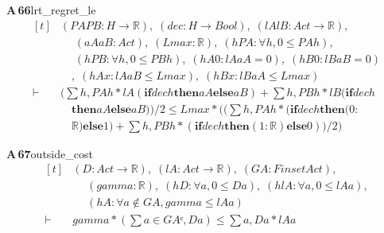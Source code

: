 \documentclass[conference]{IEEEtran}
\theoremstyle{definition}
\newcommand{\lean}[1]{\textsf{\footnotesize #1}}
\begin{document}
\noindent\textbf{A\,66}\quad\lean{lrt\_regret\_le}
{\footnotesize\[ \begin{aligned}[t]
&(\mathit{PA} \mathit{PB} : \mathit{H} \to \mathbb{R} ),\; (\mathit{dec} : \mathit{H} \to \mathit{Bool}),\; (\mathit{lA} \mathit{lB} : \mathit{Act} \to \mathbb{R} ),\\
&\quad \; (\mathit{aA} \mathit{aB} : \mathit{Act}),\; (\mathit{Lmax} : \mathbb{R} ),\; (\mathit{hPA} : \forall \mathit{h}, 0 \leq \mathit{PA} \mathit{h}),\\
&\quad \; (\mathit{hPB} : \forall \mathit{h}, 0 \leq \mathit{PB} \mathit{h}),\; (\mathit{hA0} : \mathit{lA} \mathit{aA} = 0),\; (\mathit{hB0} : \mathit{lB} \mathit{aB} = 0)\\
&\quad ,\; (\mathit{hAx} : \mathit{lA} \mathit{aB} \leq \mathit{Lmax}),\; (\mathit{hBx} : \mathit{lB} \mathit{aA} \leq \mathit{Lmax})\\
\vdash\;&(\textstyle\sum \mathit{h}, \mathit{PA} \mathit{h} * \mathit{lA} (\mathbf{if} \mathit{dec} \mathit{h} \mathbf{then} \mathit{aA} \mathbf{else} \mathit{aB}) + \textstyle\sum \mathit{h}, \mathit{PB} \mathit{h} * \mathit{lB} (\mathbf{if} \mathit{dec} \mathit{h}\\
&\quad \mathbf{then} \mathit{aA} \mathbf{else} \mathit{aB})) / 2 \leq \mathit{Lmax} * ((\textstyle\sum \mathit{h}, \mathit{PA} \mathit{h} * (\mathbf{if} \mathit{dec} \mathit{h} \mathbf{then} (0:\\
&\quad \mathbb{R} ) \mathbf{else} 1) + \textstyle\sum \mathit{h}, \mathit{PB} \mathit{h} * (\mathbf{if} \mathit{dec} \mathit{h} \mathbf{then} (1:\mathbb{R} ) \mathbf{else} 0)) / 2)
\end{aligned} \]}

\noindent\textbf{A\,67}\quad\lean{outside\_cost}
{\footnotesize\[ \begin{aligned}[t]
&(\mathit{D} : \mathit{Act} \to \mathbb{R} ),\; (\mathit{lA} : \mathit{Act} \to \mathbb{R} ),\; (\mathit{GA} : \mathit{Finset} \mathit{Act}),\\
&\quad \; (\mathit{gamma} : \mathbb{R} ),\; (\mathit{hD} : \forall \mathit{a}, 0 \leq \mathit{D} \mathit{a}),\; (\mathit{hlA} : \forall \mathit{a}, 0 \leq \mathit{lA} \mathit{a}),\\
&\quad \; (\mathit{hA} : \forall \mathit{a} \notin \mathit{GA}, \mathit{gamma} \leq \mathit{lA} \mathit{a})\\
\vdash\;&\mathit{gamma} * (\textstyle\sum \mathit{a} \in \mathit{GAᶜ}, \mathit{D} \mathit{a}) \leq \textstyle\sum \mathit{a}, \mathit{D} \mathit{a} * \mathit{lA} \mathit{a}
\end{aligned} \]}
\end{document}
